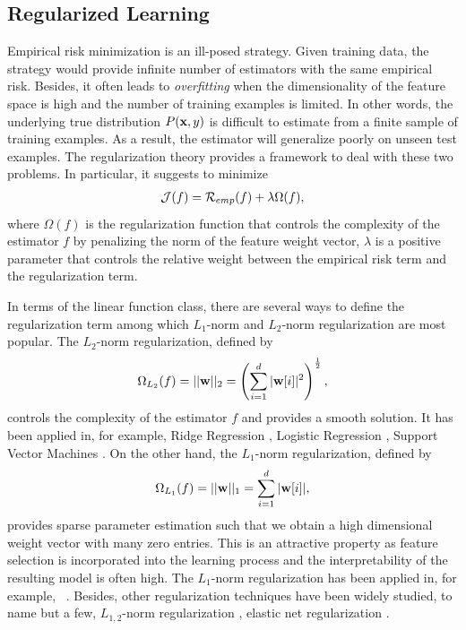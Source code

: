 \subsection{Regularized Learning}\label{sc_rl}

Empirical risk minimization is an ill-posed strategy.
Given training data, the strategy would provide infinite number of estimators with the same empirical risk.
Besides, it often leads to \textit{overfitting} when the dimensionality of the feature space is high and the number of training examples is limited.
In other words, the underlying true distribution $P(\mathbf {x},y)$ is difficult to estimate from a finite sample of training examples.
As a result, the estimator will generalize poorly on unseen test examples.
The {regularization theory} \citep{Evgeniou99a,Evgeniou02regularization} provides a framework to deal with these two problems.
In particular, it suggests to minimize 
 \begin{align}
	\mathcal{J}(f) = \mathcal{R}_{emp}(f) + \lambda\Omega(f), \label{rl}
\end{align}
where $\Omega(f)$ is the regularization function that controls the complexity of the estimator $f$ by penalizing the norm of the feature weight vector, $\lambda$ is a positive parameter that controls the relative weight between the empirical risk term and the regularization term.

In terms of the linear function class, there are several ways to define the regularization term among which $L_1$-norm and $L_2$-norm regularization are most popular.
The $L_2$-norm regularization, defined by 
\begin{align}
	\Omega_{L_2}(f) = ||\mathbf {w}||_2=\left(\sum_{i=1}^d|\mathbf {w}[i]|^2\right)^{\frac{1}{2}}, \label{l2_norm}
\end{align} 
controls the complexity of the estimator $f$ and provides a smooth solution.
It has been applied in, for example, Ridge Regression \citep{Hoerl00ridge}, Logistic Regression \citep{Chen00}, Support Vector Machines \citep{Cortes95support}.
On the other hand, the $L_1$-norm regularization, defined by
\begin{align*}
	\Omega_{L_1}(f) = ||\mathbf {w}||_1=\sum_{i=1}^d|\mathbf {w}[i]|,
\end{align*}
provides sparse parameter estimation such that we obtain a high dimensional weight vector with many zero entries.
This is an attractive property as feature selection is incorporated into the learning process and the interpretability of the resulting model is often high.
The $L_1$-norm regularization has been applied in, for example, \lasso\ \citep{Tibshirani94regression}.
Besides, other regularization techniques have been widely studied, to name but a few, $L_{1,2}$-norm regularization \citep{Argyriou07multitask}, elastic net regularization \citep{Zou05regularizationa}.


